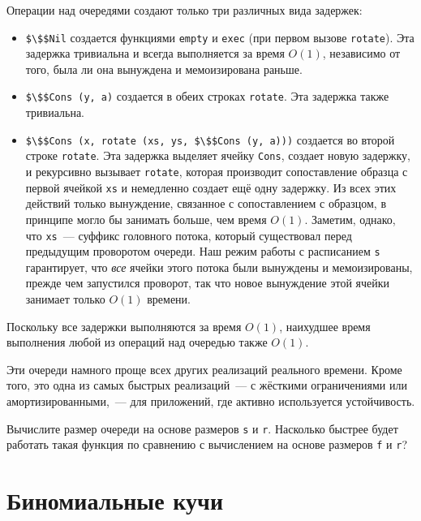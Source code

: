Операции над очередями создают только три различных вида задержек:
\begin{itemize}
\item \lstinline!$\$$Nil! создается функциями \lstinline!empty! и
  \lstinline!exec! (при первом вызове \lstinline!rotate!). Эта
  задержка тривиальна и всегда выполняется за время $O(1)$, независимо
  от того, была ли она вынуждена и мемоизирована раньше.
\item \lstinline!$\$$Cons (y, a)! создается в обеих строках
  \lstinline!rotate!. Эта задержка также тривиальна.
\item \lstinline!$\$$Cons (x, rotate (xs, ys, $\$$Cons (y, a)))!
  создается во второй строке \lstinline!rotate!. Эта задержка выделяет
  ячейку \lstinline!Cons!, создает новую задержку, и рекурсивно
  вызывает \lstinline!rotate!, которая производит сопоставление
  образца с первой ячейкой \lstinline!xs! и немедленно создает ещё
  одну задержку. Из всех этих действий только вынуждение, связанное с
  сопоставлением с образцом, в принципе могло бы занимать больше, чем
  время $O(1)$. Заметим, однако, что \lstinline!xs!~--- суффикс
  головного потока, который существовал перед предыдущим проворотом
  очереди. Наш режим работы с расписанием \lstinline!s! гарантирует,
  что \emph{все} ячейки этого потока были вынуждены и мемоизированы,
  прежде чем запустился проворот, так что новое вынуждение этой ячейки
  занимает только $O(1)$ времени.
\end{itemize}
Поскольку все задержки выполняются за время $O(1)$, наихудшее время
выполнения любой из операций над очередью также $O(1)$.

\begin{hint}
  Эти очереди намного проще всех других реализаций реального
  времени. Кроме того, это одна из самых быстрых реализаций~--- с
  жёсткими ограничениями или амортизированными,~--- для приложений,
  где активно используется устойчивость.
\end{hint}

\begin{exercise}\label{ex:7.2}
  Вычислите размер очереди на основе размеров \lstinline!s! и
  \lstinline!r!. Насколько быстрее будет работать такая функция по
  сравнению с вычислением на основе размеров \lstinline!f! и
  \lstinline!r!? 
\end{exercise}

\section{Биномиальные кучи}
\label{sc:7.3}

